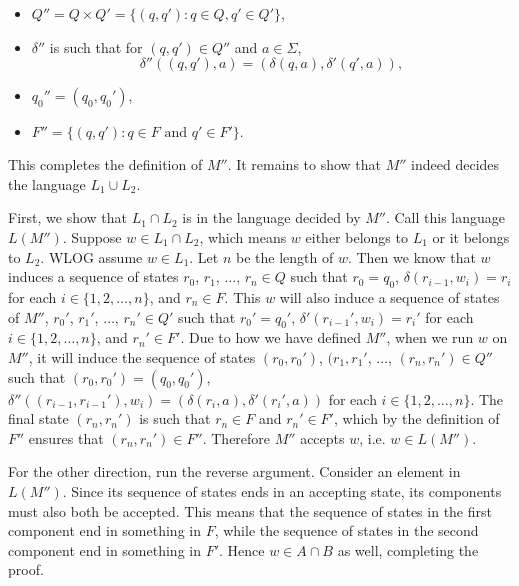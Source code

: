 \documentclass[11pt]{article}
\newcounter{enum}
\begin{document}
\begin{enumerate}
\begin{enumerate}
\begin{itemize}

\item $Q''=Q\times Q'=\{(q,q'):q\in Q, q'\in Q'\}$,

\item $\delta''$ is such that for $(q,q')\in Q''$ and $a\in\Sigma$, \[\delta''((q,q'),a) = (\delta(q,a),\delta'(q',a)),\]

\item $q_0'' = (q_0,q_0')$,

\item $F''=\{(q,q'):q\in F\text{ and }q'\in F'\}.$

\end{itemize}

This completes the definition of $M''$.  It remains to show that $M''$ indeed decides the language $L_1\cup L_2$.  

\par First, we show that $L_1\cap L_2$ is in the language decided by $M''$.  Call this language $L(M'')$.  Suppose $w\in L_1\cap L_2$, which means $w$ either belongs to $L_1$ or it belongs to $L_2$.  WLOG assume $w\in L_1$.  Let $n$ be the length of $w$.  Then we know that $w$ induces a sequence of states $r_0$, $r_1$, $\ldots$, $r_n\in Q$ such that $r_0=q_0$, $\delta(r_{i-1},w_i) = r_i$ for each $i\in\{1,2,\ldots, n\}$, and $r_n\in F$.  This $w$ will also induce a sequence of states of $M''$, $r_0'$, $r_1'$, $\ldots$, $r_n'\in Q'$ such that $r_0'=q_0'$, $\delta'(r_{i-1}',w_i) = r_i'$ for each $i\in\{1,2,\ldots, n\}$, and $r_n'\in F'$.  Due to how we have defined $M''$, when we run $w$ on $M''$, it will induce the sequence of states $(r_0,r_0')$, $(r_1,r_1'$, $\ldots$, $(r_n,r_n')\in Q''$ such that $(r_0,r_0')=(q_0,q_0')$, $\delta''((r_{i-1},r_{i-1}'),w_i) = (\delta(r_i,a),\delta'(r_i',a))$ for each $i\in\{1,2,\ldots, n\}$.  The final state $(r_n,r_n')$ is such that $r_n\in F$ and $r_n'\in F'$, which by the definition of $F''$ ensures that $(r_n,r_n')\in F''$.  Therefore $M''$ accepts $w$, i.e. $w\in L(M'')$.

\par For the other direction, run the reverse argument.  Consider an element in $L(M'')$.  Since its sequence of states ends in an accepting state, its components must also both be accepted.  This means that the sequence of states in the first component end in something in $F$, while the sequence of states in the second component end in something in $F'$.  Hence $w\in A\cap B$ as well, completing the proof. 


\end{enumerate}
\end{enumerate}
\end{document}
